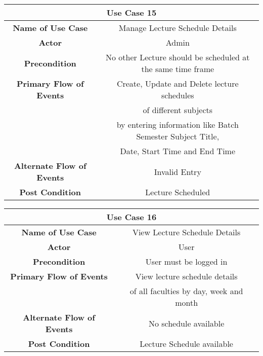 \vspace{1cm}
\begin{center}
    \begin{tabular}{|c|c|}
        \hline
        \multicolumn{2}{|c|}{Use Case 15} \\
        \hline
        \textbf{Name of Use Case} & Manage Lecture Schedule Details \\
        \hline
        \textbf{Actor} & Admin \\
        \hline
        \textbf{Precondition} & No other Lecture should be scheduled at the same time frame \\
        \hline
        \textbf{Primary Flow of Events} & Create, Update and Delete lecture schedules \\
        & of different subjects \\
        & by entering information like Batch Semester Subject Title, \\
        & Date, Start Time and End Time \\
        \hline
        \textbf{Alternate Flow of Events} & Invalid Entry \\
        \hline
        \textbf{Post Condition} & Lecture Scheduled \\
        \hline
    \end{tabular}
\end{center}

\vspace{1cm}
\begin{center}
    \begin{tabular}{|c|c|}
        \hline
        \multicolumn{2}{|c|}{Use Case 16} \\
        \hline
        \textbf{Name of Use Case} & View Lecture Schedule Details \\
        \hline
        \textbf{Actor} & User \\
        \hline
        \textbf{Precondition} & User must be logged in \\
        \hline
        \textbf{Primary Flow of Events} & View lecture schedule details \\
        & of all faculties by day, week and month \\
        \hline
        \textbf{Alternate Flow of Events} & No schedule available \\
        \hline
        \textbf{Post Condition} & Lecture Schedule available \\
        \hline
    \end{tabular}
\end{center}

